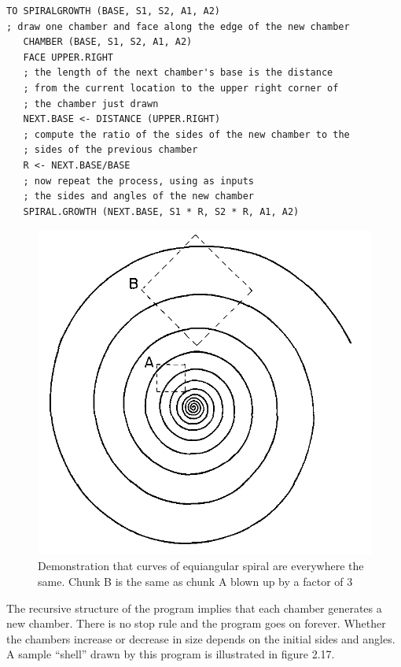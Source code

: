 \documentclass{book}
\begin{document}
\begin{verbatim}
TO SPIRALGROWTH (BASE, S1, S2, A1, A2)
; draw one chamber and face along the edge of the new chamber
   CHAMBER (BASE, S1, S2, A1, A2)
   FACE UPPER.RIGHT
   ; the length of the next chamber's base is the distance
   ; from the current location to the upper right corner of
   ; the chamber just drawn
   NEXT.BASE <- DISTANCE (UPPER.RIGHT)
   ; compute the ratio of the sides of the new chamber to the
   ; sides of the previous chamber
   R <- NEXT.BASE/BASE
   ; now repeat the process, using as inputs
   ; the sides and angles of the new chamber
   SPIRAL.GROWTH (NEXT.BASE, S1 * R, S2 * R, A1, A2)
\end{verbatim}
\begin{figure}
\begin{center}
\includegraphics[scale=1]{fig2-18}
\caption{Demonstration that curves of equiangular spiral are everywhere the same. Chunk B is the same as chunk A blown up by a factor of 3}
\end{center}
\end{figure}

The recursive structure of the program implies that each chamber generates
a new chamber. There is no stop rule and the program goes on forever.
Whether the chambers increase or decrease in size depends on the initial
sides and angles. A sample ``shell'' drawn by this program is illustrated in
figure 2.17.
\end{document}
